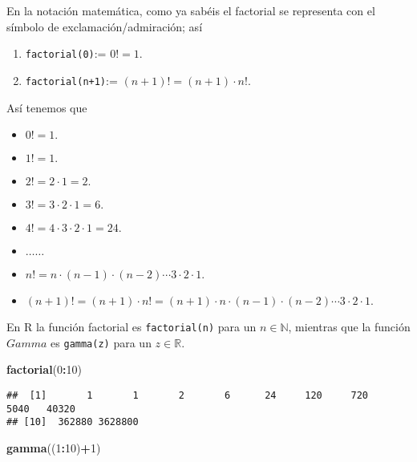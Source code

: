 \documentclass[
]{article}
\newenvironment{Shaded}{\begin{snugshade}}{\end{snugshade}}
\newcommand{\DecValTok}[1]{\textcolor[rgb]{0.00,0.00,0.81}{#1}}
\newcommand{\FunctionTok}[1]{\textcolor[rgb]{0.13,0.29,0.53}{\textbf{#1}}}
\newcommand{\NormalTok}[1]{#1}
\newcommand{\SpecialCharTok}[1]{\textcolor[rgb]{0.81,0.36,0.00}{\textbf{#1}}}
\providecommand{\tightlist}{%
  \setlength{\itemsep}{0pt}\setlength{\parskip}{0pt}}
\begin{document}
En la notación matemática, como ya sabéis el factorial se representa con
el símbolo de exclamación/admiración; así

\begin{enumerate}
\def\labelenumi{\arabic{enumi}.}
\tightlist
\item
  \texttt{factorial(0)}:= \(0!=1\).
\item
  \texttt{factorial(n+1)}:= \((n+1)!=(n+1)\cdot n!\).
\end{enumerate}

Así tenemos que

\begin{itemize}
\tightlist
\item
  \(0!=1.\)
\item
  \(1!=1.\)
\item
  \(2!= 2\cdot 1= 2.\)
\item
  \(3!=3\cdot 2\cdot 1= 6.\)
\item
  \(4!=4\cdot 3\cdot 2\cdot 1 =24.\)
\item
  \(\ldots \ldots\)
\item
  \(n!= n\cdot (n-1) \cdot (n-2) \cdots 3\cdot 2\cdot 1.\)
\item
  \((n+1)!=  (n+1)\cdot n!= (n+1)\cdot n\cdot (n-1) \cdot (n-2) \cdots 3\cdot 2\cdot 1.\)
\end{itemize}

En R la función factorial es \texttt{factorial(n)} para un
\(n\in\mathbb{N}\), mientras que la función \(Gamma\) es
\texttt{gamma(z)} para un \(z\in\mathbb{R}\).

\begin{Shaded}
\begin{Highlighting}[]
\FunctionTok{factorial}\NormalTok{(}\DecValTok{0}\SpecialCharTok{:}\DecValTok{10}\NormalTok{)}
\end{Highlighting}
\end{Shaded}

\begin{verbatim}
##  [1]       1       1       2       6      24     120     720    5040   40320
## [10]  362880 3628800
\end{verbatim}

\begin{Shaded}
\begin{Highlighting}[]
\FunctionTok{gamma}\NormalTok{((}\DecValTok{1}\SpecialCharTok{:}\DecValTok{10}\NormalTok{)}\SpecialCharTok{+}\DecValTok{1}\NormalTok{)}
\end{Highlighting}
\end{Shaded}
\end{document}
